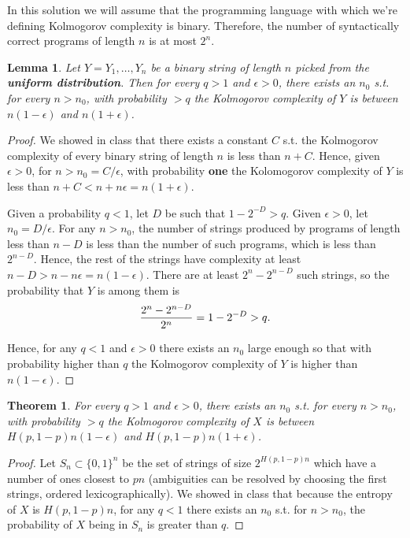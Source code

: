 \documentclass[11pt]{article} \usepackage{amssymb}
\newtheorem*{theorem*}{Theorem}
\newtheorem*{lemma*}{Lemma}
\begin{document}
\begin{enumerate}
  In this solution we will assume that the programming language with which 
  we're defining Kolmogorov complexity is binary. Therefore, the number 
  of syntactically correct programs of length $n$ is at most $2^n$.
  \begin{lemma*}
    Let $Y=Y_1,\ldots,Y_n$ be a binary string of length $n$ picked from
    the {\bf uniform distribution}. Then
    for every $q>1$ and $\epsilon>0$, there exists an $n_0$ s.t. 
    for every $n>n_0$,
    with probability $>q$ the Kolmogorov complexity of $Y$ is between
    $n(1-\epsilon)$ and $n(1+\epsilon)$.
  \end{lemma*}
  \begin{proof}
  We showed in class that there exists a constant $C$ s.t. the Kolmogorov
  complexity of every binary string of length $n$ is less than $n+C$. Hence,
  given $\epsilon>0$, for $n>n_0=C/\epsilon$, 
  with probability {\bf one} the Kolomogorov 
  complexity  of $Y$ is less than $n+C<n+n\epsilon=n(1+\epsilon)$.
  
  Given a probability $q<1$, let $D$ be such that $1-2^{-D}>q$.
  Given $\epsilon>0$, let $n_0=D/\epsilon$.   
  For any $n>n_0$, the number of strings produced by programs of 
  length less than  $n-D$ is less than the number of such programs, 
  which is less than $2^{n-D}$. Hence, the rest of the strings have complexity
  at least $n-D>n-n\epsilon=n(1-\epsilon)$. 
  There are at least $2^n-2^{n-D}$ such strings, so the probability that $Y$
  is among them is
  \begin{equation*}
    {2^n-2^{n-D} \over 2^n}=1-2^{-D}>q.           
  \end{equation*}
 
  Hence, for any $q<1$ and $\epsilon>0$ there exists an $n_0$ large enough
  so that with probability higher than $q$ the Kolmogorov complexity of
  $Y$ is higher than $n(1-\epsilon)$.
  \end{proof}
  
  \begin{theorem*}
    For every $q>1$ and $\epsilon>0$, 
    there exists an $n_0$ s.t. for every $n>n_0$,
    with probability $>q$ the Kolmogorov complexity of $X$ is between
    $H(p,1-p)n(1-\epsilon)$ and $H(p,1-p)n(1+\epsilon)$.
  \end{theorem*}
  \begin{proof}

  Let $S_n\subset \{0,1\}^n$ be the set of strings of 
  size $2^{H(p,1-p)n}$ which have a number 
  of ones closest to $pn$ (ambiguities can be resolved by choosing the 
  first strings, ordered lexicographically). We showed in class
  that because the entropy of $X$ is $H(p,1-p)n$, 
  for any $q<1$ there exists an $n_0$ s.t. for $n>n_0$, 
  the probability of $X$ being in $S_n$ is greater than $q$. 


\end{proof}
\end{enumerate}
\end{document}
